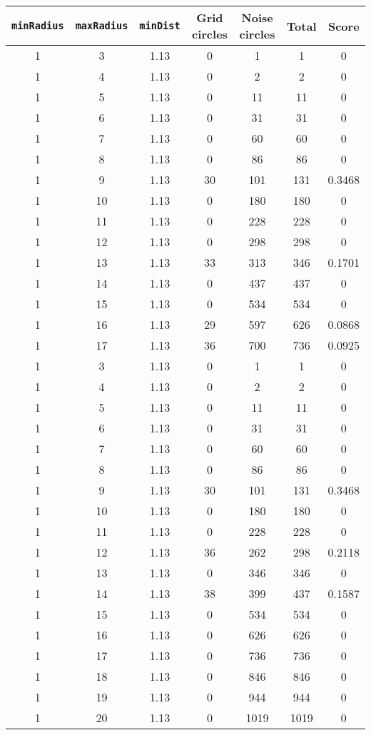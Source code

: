 \documentclass[letterpaper, 12pt]{article}
\begin{document}
\begin{longtable}{|c|c|c|c|c|c|c|}
\hline
\textbf{\texttt{minRadius}} & \textbf{\texttt{maxRadius}} & \textbf{\texttt{minDist}} & \textbf{Grid circles} & \textbf{Noise circles} & \textbf{Total} & \textbf{Score} \\
\hline
1 & 3 & 1.13 & 0 & 1 & 1 & 0 \\
\hline
1 & 4 & 1.13 & 0 & 2 & 2 & 0 \\
\hline
1 & 5 & 1.13 & 0 & 11 & 11 & 0 \\
\hline
1 & 6 & 1.13 & 0 & 31 & 31 & 0 \\
\hline
1 & 7 & 1.13 & 0 & 60 & 60 & 0 \\
\hline
1 & 8 & 1.13 & 0 & 86 & 86 & 0 \\
\hline
1 & 9 & 1.13 & 30 & 101 & 131 & 0.3468 \\
\hline
1 & 10 & 1.13 & 0 & 180 & 180 & 0 \\
\hline
1 & 11 & 1.13 & 0 & 228 & 228 & 0 \\
\hline
1 & 12 & 1.13 & 0 & 298 & 298 & 0 \\
\hline
1 & 13 & 1.13 & 33 & 313 & 346 & 0.1701 \\
\hline
1 & 14 & 1.13 & 0 & 437 & 437 & 0 \\
\hline
1 & 15 & 1.13 & 0 & 534 & 534 & 0 \\
\hline
1 & 16 & 1.13 & 29 & 597 & 626 & 0.0868 \\
\hline
1 & 17 & 1.13 & 36 & 700 & 736 & 0.0925 \\
\hline
1 & 3 & 1.13 & 0 & 1 & 1 & 0 \\
\hline
1 & 4 & 1.13 & 0 & 2 & 2 & 0 \\
\hline
1 & 5 & 1.13 & 0 & 11 & 11 & 0 \\
\hline
1 & 6 & 1.13 & 0 & 31 & 31 & 0 \\
\hline
1 & 7 & 1.13 & 0 & 60 & 60 & 0 \\
\hline
1 & 8 & 1.13 & 0 & 86 & 86 & 0 \\
\hline
1 & 9 & 1.13 & 30 & 101 & 131 & 0.3468 \\
\hline
1 & 10 & 1.13 & 0 & 180 & 180 & 0 \\
\hline
1 & 11 & 1.13 & 0 & 228 & 228 & 0 \\
\hline
1 & 12 & 1.13 & 36 & 262 & 298 & 0.2118 \\
\hline
1 & 13 & 1.13 & 0 & 346 & 346 & 0 \\
\hline
1 & 14 & 1.13 & 38 & 399 & 437 & 0.1587 \\
\hline
1 & 15 & 1.13 & 0 & 534 & 534 & 0 \\
\hline
1 & 16 & 1.13 & 0 & 626 & 626 & 0 \\
\hline
1 & 17 & 1.13 & 0 & 736 & 736 & 0 \\
\hline
1 & 18 & 1.13 & 0 & 846 & 846 & 0 \\
\hline
1 & 19 & 1.13 & 0 & 944 & 944 & 0 \\
\hline
1 & 20 & 1.13 & 0 & 1019 & 1019 & 0 \\
\hline
\end{longtable}
\end{document}
